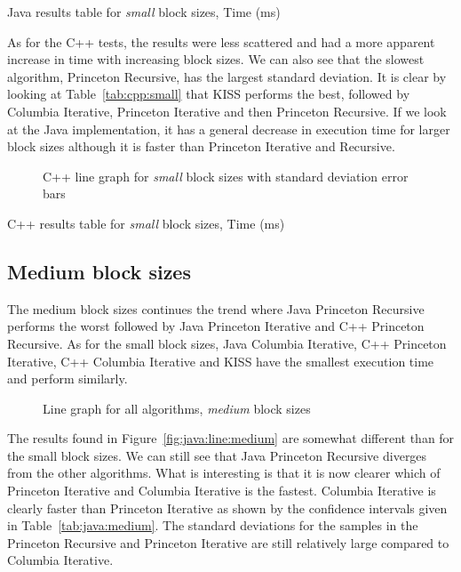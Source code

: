 \ifrelease
\begin{table}
    \centering
    \caption{Java results table for \emph{small} block sizes, Time (ms)}
    \label{tab:java:small}
    
\end{table}
\fi

As for the C++ tests, the results were less scattered and had a more apparent increase in time with increasing block sizes. We can also see that the slowest algorithm, Princeton Recursive, has the largest standard deviation. It is clear by looking at Table~\ref{tab:cpp:small} that KISS performs the best, followed by Columbia Iterative, Princeton Iterative and then Princeton Recursive. If we look at the Java implementation, it has a general decrease in execution time for larger block sizes although it is faster than Princeton Iterative and Recursive.

\ifrelease
\begin{figure}
    \centering
    
    \caption{C++ line graph for \emph{small} block sizes with standard deviation error bars}
    \label{fig:cpp:line:small}
\end{figure}
\fi

\ifrelease
\begin{table}
    \centering
    \caption{C++ results table for \emph{small} block sizes, Time (ms)}
    \label{tab:cpp:small}
    \resizebox{\columnwidth}{!}{%
        
    }
\end{table}
\fi


\subsection{Medium block sizes}
The medium block sizes continues the trend where Java Princeton Recursive performs the worst followed by Java Princeton Iterative and C++ Princeton Recursive. As for the small block sizes, Java Columbia Iterative, C++ Princeton Iterative, C++ Columbia Iterative and KISS have the smallest execution time and perform similarly.

\ifrelease
\begin{figure}
    \centering
    
    \caption{Line graph for all algorithms, \emph{medium} block sizes}
    \label{fig:all:line:medium}
\end{figure}
\fi

The results found in Figure~\ref{fig:java:line:medium} are somewhat different than for the small block sizes. We can still see that Java Princeton Recursive diverges from the other algorithms. What is interesting is that it is now clearer which of Princeton Iterative and Columbia Iterative is the fastest. Columbia Iterative is clearly faster than Princeton Iterative as shown by the confidence intervals given in Table~\ref{tab:java:medium}. The standard deviations for the samples in the Princeton Recursive and Princeton Iterative are still relatively large compared to Columbia Iterative.

